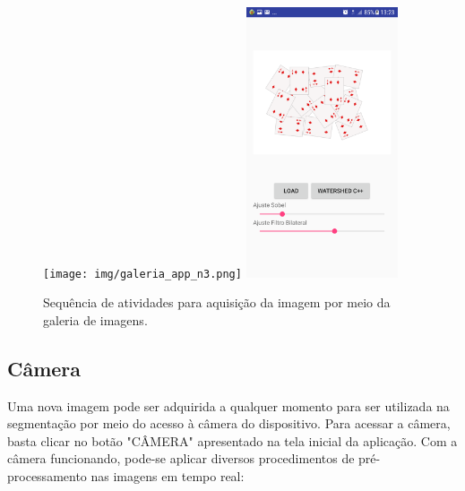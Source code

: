 \begin{figure}[!htb]
 \centering
 \def\baselinestretch{1}\small\normalsize
 \texttt{[image: img/galeria\_app\_n3.png]}\qquad
 \includegraphics[width=0.4\textwidth]{img/galeria_app_n4.png} 
 \caption{\label{fig:galeria_app_p2}Sequência de atividades para aquisição da imagem por meio da galeria de imagens.}
\end{figure}
\clearpage
 
\subsection{Câmera}

Uma nova imagem pode ser adquirida a qualquer momento para ser utilizada na segmentação por meio do acesso à câmera do dispositivo. Para acessar a câmera, basta clicar no botão "CÂMERA" apresentado na tela inicial da aplicação.
Com a câmera funcionando, pode-se aplicar diversos procedimentos de pré-processamento nas imagens em tempo real:

